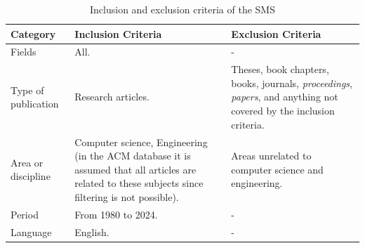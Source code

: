 \begin{table}[htbp]
	\centering
	\caption{Inclusion and exclusion criteria of the SMS}
	\label{table:Criteria}
	\renewcommand{\arraystretch}{1}  %
	\begin{tabular}{p{2.7cm}p{7cm}p{7cm}}
		\toprule
		\textbf{Category}   & \textbf{Inclusion Criteria}                                                                                                                        & \textbf{Exclusion Criteria}                                                                                                        \\
		\midrule
		Fields              & All.                                                                                                                                               & -                                                                                                                                  \\
		\addlinespace[0.8em]
		Type of publication & Research articles.                                                                                                                                 & Theses, book chapters, books, journals, \textit{proceedings}, \textit{papers}, and anything not covered by the inclusion criteria. \\
		\addlinespace[0.8em]
		Area or discipline  & Computer science, Engineering (in the ACM database it is assumed that all articles are related to these subjects since filtering is not possible). & Areas unrelated to computer science and engineering.                                                                               \\
		\addlinespace[0.8em]
		Period              & From 1980 to 2024.                                                                                                                                 & -                                                                                                                                  \\
		\addlinespace[0.8em]
		Language            & English.                                                                                                                                           & -                                                                                                                                  \\
		\bottomrule
	\end{tabular}
\end{table}

